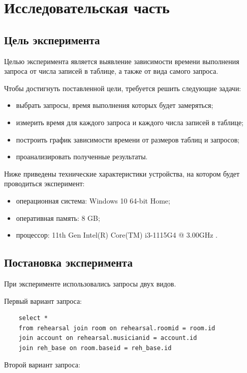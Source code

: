 \section{Исследовательская часть}

\subsection{Цель эксперимента}

Целью эксперимента является выявление зависимости времени выполнения запроса от числа записей в таблице, а также от вида самого запроса.

Чтобы достигнуть поставленной цели, требуется решить следующие задачи:
\begin{itemize}
	\item выбрать запросы, время выполнения которых будет замеряться;
	\item измерить время для каждого запроса и каждого числа записей в таблице;
	\item построить график зависимости времени от размеров таблиц и запросов;
	\item проанализировать полученные результаты.
\end{itemize}

Ниже приведены технические характеристики устройства, на котором будет проводиться эксперимент:
\begin{itemize}
	\item операционная система: Windows 10 64-bit Home;
	\item оперативная память: 8 GB;
	\item процессор: 11th Gen Intel(R) Core(TM) i3-1115G4 @ 3.00GHz \cite{intel}.
\end{itemize}

\subsection{Постановка эксперимента}

При эксперименте использовались запросы двух видов.

Первый вариант запроса:

\begin{lstlisting}
	select *
	from rehearsal join room on rehearsal.roomid = room.id
	join account on rehearsal.musicianid = account.id
	join reh_base on room.baseid = reh_base.id
\end{lstlisting}

Второй вариант запроса:

